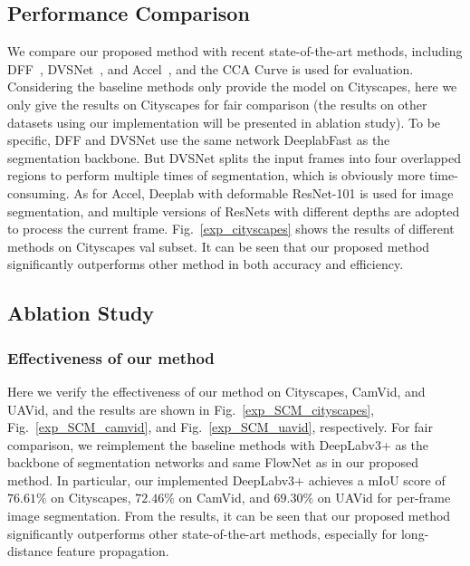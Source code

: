 \documentclass[journal]{IEEEtran}
\begin{document}
\subsection{Performance Comparison}

We compare our proposed method with recent state-of-the-art methods, including DFF~\cite{zhu2017deep}, DVSNet~\cite{xu2018dynamic}, and Accel~\cite{jain2019accel}, and the CCA Curve is used for evaluation. 
Considering the baseline methods only provide the model on Cityscapes, here we only give the results on Cityscapes for fair comparison (the results on other datasets using our implementation will be presented in ablation study). To be specific, DFF and DVSNet use the same network DeeplabFast  as the segmentation backbone. But DVSNet splits the input frames into four overlapped regions to perform multiple times of segmentation, which is obviously more time-consuming. As for Accel, Deeplab with deformable ResNet-101 is used for image segmentation, and multiple versions of ResNets with different depths are adopted to process the current frame. Fig.~\ref{exp_cityscapes} shows the results of different methods on Cityscapes val subset. It can be seen that our proposed method significantly outperforms other method in both accuracy and efficiency. 

\subsection{Ablation Study}

\subsubsection{Effectiveness of our method}

Here we verify the effectiveness of our method on Cityscapes, CamVid, and UAVid, and the results are shown in Fig.~\ref{exp_SCM_cityscapes}, Fig.~\ref{exp_SCM_camvid}, and Fig.~\ref{exp_SCM_uavid}, respectively. For fair comparison, we reimplement the baseline methods with DeepLabv3+ as the backbone of segmentation networks and same FlowNet as in our proposed method. In particular, our implemented DeepLabv3+ achieves a mIoU score of $76.61\%$ on Cityscapes, $72.46\%$ on CamVid, and $69.30\%$ on UAVid for per-frame image segmentation. From the results, it can be seen that our proposed method significantly outperforms other state-of-the-art methods, especially for long-distance feature propagation. 
\end{document}
